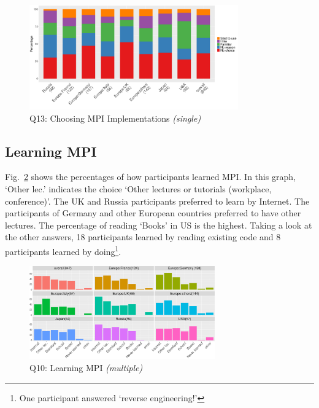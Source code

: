 \documentclass[conference,10pt,letterpaper]{IEEEtran}
\def\myquote#1{`#1'}
\begin{document}
{{    \begin{figure}[htb]
      \begin{center}
        \includegraphics[width=9cm]{R-scripts/Q13.pdf}
        \caption{Q13: Choosing MPI Implementations {\it(single)}}
        \label{fig:choosing-implementation}
      \end{center}
    \end{figure}
  }
}
        
\subsection{Learning MPI}

Fig.~\ref{fig:learning-mpi} shows the percentages of how participants
learned MPI. In this graph, \myquote{Other lec.} indicates the choice
\myquote{Other lectures or tutorials (workplace, conference)}. The
UK and Russia participants preferred to learn by Internet. The
participants of Germany and other European countries preferred to have
other lectures. The percentage of reading \myquote{Books} in US is the
highest. Taking a look at the other answers, 18 participants learned
by reading existing code and 8 participants learned by
doing\footnote{One participant answered \myquote{reverse engineering!}}. 

\begin{figure}[htb]
\begin{center}
\includegraphics[width=8cm]{R-scripts/Q10.pdf}
\caption{Q10: Learning MPI {\it(multiple)}}
\label{fig:learning-mpi}
\end{center}
\end{figure}
\end{document}
